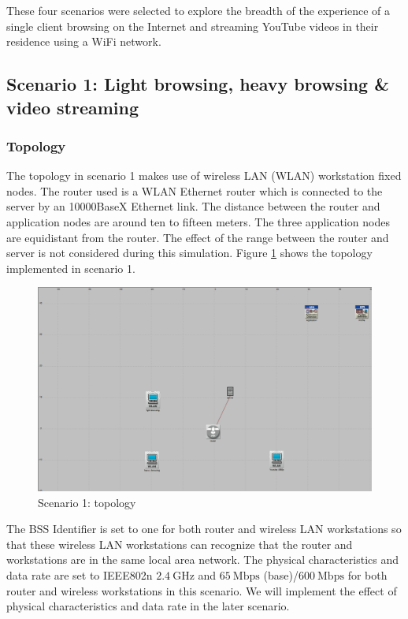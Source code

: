 These four scenarios were selected to explore the breadth of the experience of a single client browsing on the Internet and streaming YouTube videos in their residence using a \gls{WiFi} network.

\subsection{Scenario 1: Light browsing, heavy browsing \& video streaming} \label{subsec:riverbed:1}
\subsubsection{Topology} \label{subsubsec:1:topo}
The topology in scenario 1 makes use of wireless LAN (\gls{WLAN}) workstation fixed nodes. The router used is a \gls{WLAN} Ethernet router which is connected to the server by an 10000BaseX Ethernet link. The distance between the router and application nodes are around ten to fifteen meters. The three application nodes are equidistant from the router. The effect of the range between the router and server is not considered during this simulation. Figure \ref{fig:1:topo} shows the topology implemented in scenario 1.

\begin{figure}[H]
	\centering
	\includegraphics[scale=0.3]{Figures/amantianrenamed/Scenarioonetopology.png}
	\caption{Scenario 1: topology}
	\label{fig:1:topo}
\end{figure}

The BSS Identifier is set to one for both router and wireless LAN workstations so that these wireless LAN workstations can recognize that the router and workstations are in the same local area network. The physical characteristics and data rate are set to \gls{IEEE802}n $2.4~\mathrm{GHz}$ and $65~\mathrm{Mbps}$ (base)/$600~\mathrm{Mbps}$ for both router and wireless workstations in this scenario. We will implement the effect of physical characteristics and data rate in the later scenario.

